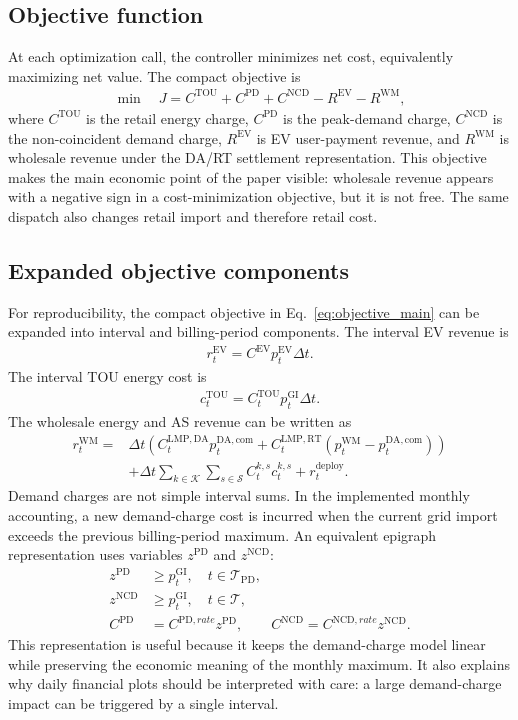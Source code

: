 \documentclass[final,5p,times]{elsarticle}
\newcommand{\DeltaT}{\Delta t}
\newcommand{\EV}{\mathrm{EV}}
\newcommand{\DA}{\mathrm{DA}}
\newcommand{\RT}{\mathrm{RT}}
\newcommand{\GI}{\mathrm{GI}}
\newcommand{\TOU}{\mathrm{TOU}}
\newcommand{\PD}{\mathrm{PD}}
\newcommand{\NCD}{\mathrm{NCD}}
\newcommand{\WM}{\mathrm{WM}}
\newcommand{\calT}{\mathcal{T}}
\newcommand{\calK}{\mathcal{K}}
\newcommand{\calS}{\mathcal{S}}
\begin{document}
\subsection{Objective function}
At each optimization call, the controller minimizes net cost, equivalently maximizing net value. The compact objective is
\begin{align}
\min \quad
J = C^{\TOU}+C^{\PD}+C^{\NCD}-R^{\EV}-R^{\WM},
\label{eq:objective_main}
\end{align}
where $C^{\TOU}$ is the retail energy charge, $C^{\PD}$ is the peak-demand charge, $C^{\NCD}$ is the non-coincident demand charge, $R^{\EV}$ is EV user-payment revenue, and $R^{\WM}$ is wholesale revenue under the DA/RT settlement representation. This objective makes the main economic point of the paper visible: wholesale revenue appears with a negative sign in a cost-minimization objective, but it is not free. The same dispatch also changes retail import and therefore retail cost.

\subsection{Expanded objective components}
For reproducibility, the compact objective in Eq.~\eqref{eq:objective_main} can be expanded into interval and billing-period components. The interval EV revenue is
\begin{align}
r_t^{\EV}=C^{\EV}p_t^{\EV}\DeltaT.
\label{eq:interval_ev_rev}
\end{align}
The interval TOU energy cost is
\begin{align}
c_t^{\TOU}=C_t^{\TOU}p_t^{\GI}\DeltaT.
\label{eq:interval_tou}
\end{align}
The wholesale energy and AS revenue can be written as
\begin{align}
r_t^{\WM}=&\DeltaT\left(C_t^{\mathrm{LMP},\DA}p_t^{\DA,\mathrm{com}}+C_t^{\mathrm{LMP},\RT}\left(p_t^{\WM}-p_t^{\DA,\mathrm{com}}\right)\right)\nonumber\\
&+\DeltaT\sum_{k\in\calK}\sum_{s\in\calS}C_t^{k,s}c_t^{k,s}+r_t^{\mathrm{deploy}}.
\label{eq:interval_wm_rev}
\end{align}
Demand charges are not simple interval sums. In the implemented monthly accounting, a new demand-charge cost is incurred when the current grid import exceeds the previous billing-period maximum. An equivalent epigraph representation uses variables $z^{\PD}$ and $z^{\NCD}$:
\begin{align}
z^{\PD}&\ge p_t^{\GI},\quad t\in\calT_{\PD},\label{eq:pd_epigraph}\\
z^{\NCD}&\ge p_t^{\GI},\quad t\in\calT,\label{eq:ncd_epigraph}\\
C^{\PD}&=C^{\PD,rate}z^{\PD},\qquad C^{\NCD}=C^{\NCD,rate}z^{\NCD}.\label{eq:dem_epigraph_cost}
\end{align}
This representation is useful because it keeps the demand-charge model linear while preserving the economic meaning of the monthly maximum. It also explains why daily financial plots should be interpreted with care: a large demand-charge impact can be triggered by a single interval.
\end{document}
